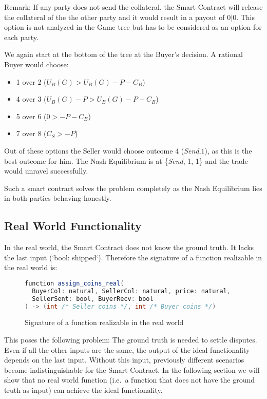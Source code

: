 \documentclass{cacthesis}
\begin{document}
Remark: If any party does not send the collateral, the Smart Contract will release the collateral of the the other party and it would result in a payout of $0|0$. This option is not analyzed in the Game tree but has to be considered as an option for each party.\newline

We again start at the bottom of the tree at the Buyer's decision. A rational Buyer would choose: 
\begin{itemize}
    \item 1 over 2 ($U_B(G) > U_B(G) - P - C_B$)
    \item 4 over 3 ($U_B(G) - P > U_B(G) - P - C_B $)
    \item 5 over 6 ($0> -P-C_B$)
    \item 7 over 8 ($C_S > -P$)
\end{itemize}
Out of these options the Seller would choose outcome 4 (\emph{Send},$1$), as this is the best outcome for him.
The Nash Equilibrium is at \{\emph{Send}, 1, 1\} and the trade would unravel successfully.\newline

Such a smart contract solves the problem completely as the Nash Equilibrium lies in both parties behaving honestly.
\subsection{Real World Functionality}
In the real world, the Smart Contract does not know the ground truth. It lacks the last input (‘bool: shipped‘). Therefore the signature of a function realizable in the real world is:\newline
\begin{figure}[htb!]
\begin{lstlisting}[language=java]
function assign_coins_real(
  BuyerCol: natural, SellerCol: natural, price: natural,
  SellerSent: bool, BuyerRecv: bool
) -> (int /* Seller coins */, int /* Buyer coins */)
\end{lstlisting}
 \centering
    \caption{Signature of a function realizable in the real world}
    \label{fig:real_world_function_signature}
\end{figure}

This poses the following problem: The ground truth is needed to settle disputes. Even if all the other inputs are the same, the output of the ideal functionality depends on the last input. Without this input, previously different scenarios become indistinguishable for the Smart Contract. In the following section we will show that no real world function (i.e.\ a function that does not have the ground truth as input) can achieve the ideal functionality.\newline
\end{document}

